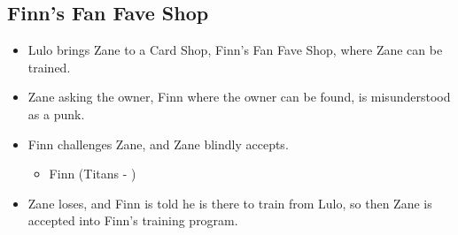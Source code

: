 \subsection{Finn's Fan Fave Shop}
\begin{itemize}
    \item Lulo brings Zane to a Card Shop, Finn's Fan Fave Shop, where Zane can be trained. 
    \item Zane asking the owner, Finn where the owner can be found, is misunderstood as a punk. 
    \item Finn challenges Zane, and Zane blindly accepts. 
        \begin{itemize}
            \item Finn (Titans - )
        \end{itemize}
    \item Zane loses, and Finn is told he is there to train from Lulo, so then Zane is accepted 
    into Finn's training program. 
\end{itemize}